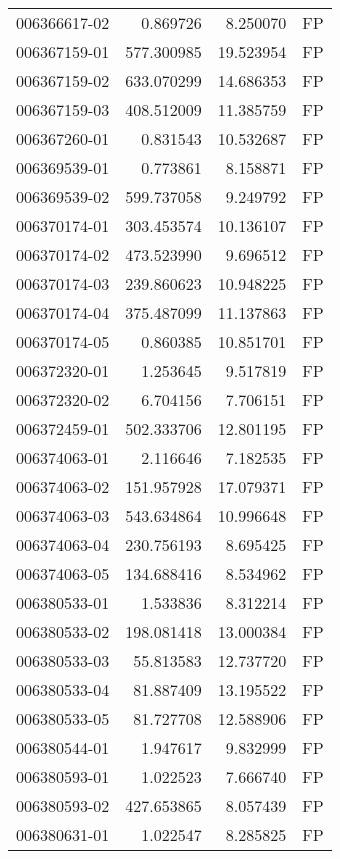 \begin{tabular}{lrrl}
006366617-02 &    0.869726 &     8.250070 &   FP \\
006367159-01 &  577.300985 &    19.523954 &   FP \\
006367159-02 &  633.070299 &    14.686353 &   FP \\
006367159-03 &  408.512009 &    11.385759 &   FP \\
006367260-01 &    0.831543 &    10.532687 &   FP \\
006369539-01 &    0.773861 &     8.158871 &   FP \\
006369539-02 &  599.737058 &     9.249792 &   FP \\
006370174-01 &  303.453574 &    10.136107 &   FP \\
006370174-02 &  473.523990 &     9.696512 &   FP \\
006370174-03 &  239.860623 &    10.948225 &   FP \\
006370174-04 &  375.487099 &    11.137863 &   FP \\
006370174-05 &    0.860385 &    10.851701 &   FP \\
006372320-01 &    1.253645 &     9.517819 &   FP \\
006372320-02 &    6.704156 &     7.706151 &   FP \\
006372459-01 &  502.333706 &    12.801195 &   FP \\
006374063-01 &    2.116646 &     7.182535 &   FP \\
006374063-02 &  151.957928 &    17.079371 &   FP \\
006374063-03 &  543.634864 &    10.996648 &   FP \\
006374063-04 &  230.756193 &     8.695425 &   FP \\
006374063-05 &  134.688416 &     8.534962 &   FP \\
006380533-01 &    1.533836 &     8.312214 &   FP \\
006380533-02 &  198.081418 &    13.000384 &   FP \\
006380533-03 &   55.813583 &    12.737720 &   FP \\
006380533-04 &   81.887409 &    13.195522 &   FP \\
006380533-05 &   81.727708 &    12.588906 &   FP \\
006380544-01 &    1.947617 &     9.832999 &   FP \\
006380593-01 &    1.022523 &     7.666740 &   FP \\
006380593-02 &  427.653865 &     8.057439 &   FP \\
006380631-01 &    1.022547 &     8.285825 &   FP \\

\end{tabular}
